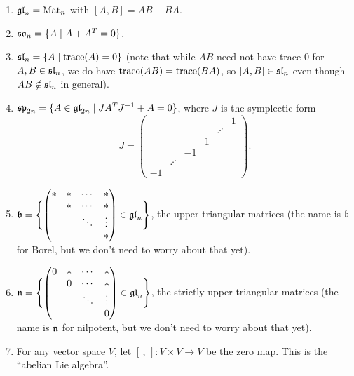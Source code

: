 \begin{example}\leavevmode
\begin{enumerate}
  \item $\gl_n = \Mat_n$ with $[A, B] = AB - BA$.
  \item $\so_n = \setc{A}{A + A^T = 0}$.
  \item $\sl_n = \setc{A}{\tr(A) = 0}$ (note that while $AB$ need not have
    trace $0$ for $A, B \in \sl_n$, we do have $\tr(AB) = \tr(BA)$, so
    $[A, B] \in \sl_n$ even though $AB \notin \sl_n$ in general).
  \item $\spl_{2n} = \setc{A \in \gl_{2n}}{JA^TJ^{-1} + A = 0}$, where $J$ is
    the symplectic form
    \[
      J = \begin{pmatrix}
            &&&&& 1\\
            &&&& \iddots &\\
            &&& 1 &&\\
            && -1 &&&\\
            & \iddots &&&&\\
            -1 &&&&&
          \end{pmatrix}.
    \]
  \item $\fb = \Biggl\{ \begin{pmatrix}
            * & * & \cdots & *\\
              & * & \cdots & *\\
              &   & \ddots & \vdots\\
              &   &        & *
          \end{pmatrix} \in \gl_n \Biggr\}$,
    the upper triangular matrices (the name is $\fb$ for Borel, but we don't
    need to worry about that yet).
  \item $\fn = \Biggl\{ \begin{pmatrix}
            0 & * & \cdots & *\\
              & 0 & \cdots & *\\
              &   & \ddots & \vdots\\
              &   &        & 0
          \end{pmatrix} \in \gl_n \Biggr\}$,
    the strictly upper triangular matrices (the name is $\fn$ for nilpotent,
    but we don't need to worry about that yet).
  \item For any vector space $V$, let $[\,,\,]\colon V \times V \to V$ be the
    zero map. This is the ``abelian Lie algebra''.
\end{enumerate}
\end{example}

